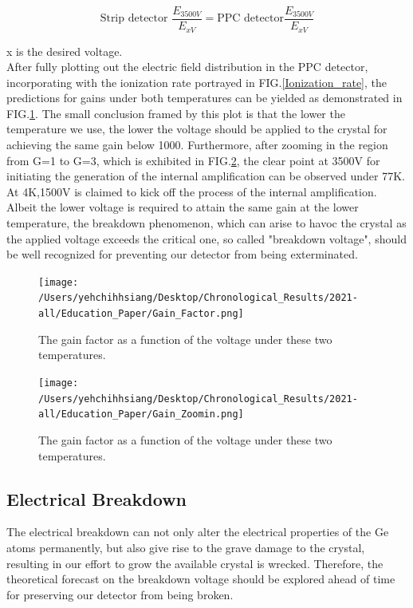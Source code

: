 \documentclass[%
 reprint,
 amsmath,amssymb,
 aps,
]{revtex4-2}
\begin{document}
\begin{equation}\label{bulk_leakage_current}
\text{Strip detector }\frac{E_{3500V}}{E_{xV}}= \text{PPC detector} \frac{E_{3500V}}{E_{xV}}
\end{equation}

x is the desired voltage.\\

After fully plotting out the electric field distribution in the PPC detector, incorporating with the ionization rate portrayed in FIG.\ref{Ionization_rate}, the predictions for gains under both temperatures can be 
yielded as demonstrated in FIG.\ref{Gain}. The small conclusion framed by this plot is that the lower the temperature we use, the lower the voltage should be applied to the crystal for achieving the same gain below 1000. Furthermore, after zooming in the region from G=1 to G=3, which is exhibited in FIG.\ref{Gain_Zoom}, the clear point at 3500V for initiating the generation of the internal amplification can be observed under 77K. At 4K,1500V is claimed to kick off the process of the internal amplification.\\

Albeit the lower voltage is required to attain the same gain at the lower temperature, the breakdown phenomenon, which can arise to havoc the crystal as the applied voltage exceeds the critical one, so called "breakdown voltage", should be well recognized for preventing our detector from being exterminated. 

\begin{figure}[h]
  \centering
  \texttt{[image: /Users/yehchihhsiang/Desktop/Chronological\_Results/2021-all/Education\_Paper/Gain\_Factor.png]}
  \caption{The gain factor as a function of the voltage under these two temperatures.}
  \label{Gain}
\end{figure}

\begin{figure}[h]
  \centering
  \texttt{[image: /Users/yehchihhsiang/Desktop/Chronological\_Results/2021-all/Education\_Paper/Gain\_Zoomin.png]}
  \caption{The gain factor as a function of the voltage under these two temperatures.}
  \label{Gain_Zoom}
\end{figure}


\subsection{Electrical Breakdown}
The electrical breakdown can not only alter the electrical properties of the Ge atoms permanently, but also give rise to the grave damage to the crystal, resulting in our effort to grow the available crystal is wrecked. Therefore, the theoretical forecast on the breakdown voltage should be explored ahead of time for preserving our detector from being broken.\\
\end{document}
